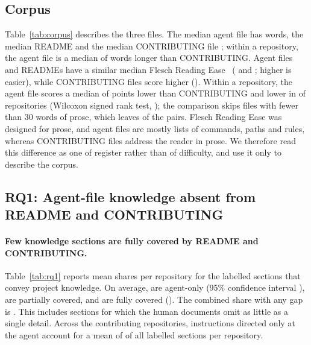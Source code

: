 \documentclass[sigconf,nonacm]{acmart}
\begin{document}
\subsection{Corpus}\label{sec:corpus}



Table~\ref{tab:corpus} describes the three files. The median agent file has \agentWords{} words,
the median README \readmeWords{} and the median CONTRIBUTING file \contribWords; within a repository,
the agent file is a median of \wordsGapContrib{} words longer than CONTRIBUTING. Agent files and
READMEs have a similar median Flesch Reading Ease~\cite{flesch1948readability} (\agentFlesch{} and
\readmeFlesch; higher is easier), while CONTRIBUTING files score higher (\contribFlesch). Within a
repository, the agent file scores a median of \fleschGapContrib{} points lower than CONTRIBUTING and
lower in \fleschHarderShare{} of \fleschPairs{} repositories (Wilcoxon signed rank test,
\fleschContribP); the comparison skips files with fewer than 30 words of prose, which leaves
\fleschPairs{} of the \nSampleRepos{} pairs. Flesch Reading Ease was designed for prose, and agent
files are mostly lists of commands, paths and rules, whereas CONTRIBUTING files address the reader
in prose. We therefore read this difference as one of register rather than of difficulty, and use it
only to describe the corpus.

\subsection{RQ1: Agent-file knowledge absent from README and CONTRIBUTING}\label{sec:rq1}



\paragraph{Few knowledge sections are fully covered by README and CONTRIBUTING.}
Table~\ref{tab:rq1} reports mean shares per repository for the \nKnowledgeUnits{} labelled sections
that convey project knowledge. On average, \agentOnlyOverall{} are agent-only (95\% confidence
interval \agentOnlyOverallCI), \partialOverall{} are partially covered, and \sharedOverall{} are
fully covered (\sharedOverallCI). The combined share with any gap is \anyGapOverall{}. This
includes sections for which the human documents omit as little as a single detail. Across the
contributing repositories, instructions directed only at the agent account for a mean of
\agentDirectedOverall{} of all labelled sections per repository.
\end{document}
